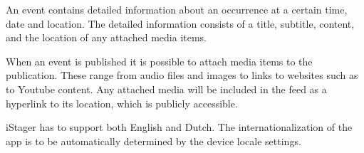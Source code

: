 An event contains detailed information about an occurrence at a certain time, date and location. The detailed information consists of a title, subtitle, content, and the location of any attached media items. 

When an event is published it is possible to attach media items to the publication. These range from audio files and images to links to websites such as to Youtube content. Any attached media will be included in the feed as a hyperlink to its location, which is publicly accessible.

iStager has to support both English and Dutch. The internationalization of the app is to be automatically determined by the device locale settings. 



